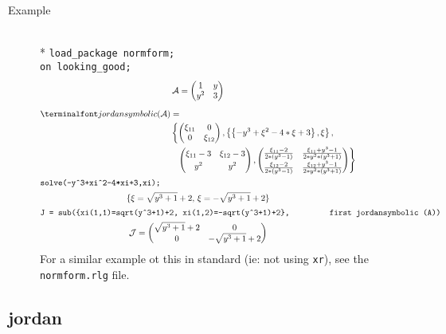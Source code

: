 \begin{description}
\item[Example]\mbox{}\\*
%
\texttt{load\_package normform;}\\
\texttt{on looking\_good;} 
\begin{gather*}
\mathcal{A} = \begin{pmatrix} 1 & y \\ y^2 & 3  \end{pmatrix}  \\[2mm]
\begin{split}
\f{jordansymbolic}(\mathcal{A}) &= \\ 
 & \left\{
     \begin{pmatrix} \xi_{11} & 0 \\ 0 & \xi_{12} \end{pmatrix} ,
     \left\{ \left\{ -y^3+\xi^2-4*\xi+3 \right\}, \xi \right\}, \right. \\
 & \hspace{0.1in} \left.
       \begin{pmatrix} \xi_{11} -3 & \xi_{12} -3 \\[1mm] y^2 & y^2 \end{pmatrix},
       \begin{pmatrix} \frac{\xi_{11} -2} {2*(y^3-1)}
                 & \frac{\xi_{11} + y^3 -1}{2*y^2*(y^3+1)} \\[1mm]
                \frac{\xi_{12} -2}{2*(y^3-1)}
                 & \frac{\xi_{12}+y^3-1}{2*y^2*(y^3+1)}
       \end{pmatrix}
  \right\} 
\end{split} \\
\intertext{\texttt{solve(-y\^{}3+xi\^{}2-4*xi+3,xi);}}
\{ \xi = \sqrt{y^3+1} + 2,\, \xi = -\sqrt{y^3+1}+2 \} \\
\intertext{\texttt{J = sub(\{xi(1,1)=sqrt(y\^{}3+1)+2, xi(1,2)=-sqrt(y\^{}3+1)+2\},
   \mbox{}\ \ \ \ \ \ \ \ first  jordansymbolic (A))}}
%
\mathcal{J} = \begin{pmatrix} \sqrt{y^3+1} + 2 & 0 \\ 0 & 
-\sqrt{y^3+1} + 2 \end{pmatrix}
\end{gather*}
For a similar example ot this in standard {\REDUCE} (ie: not using 
\texttt{xr}), see the \texttt{normform.rlg} file.
\end{description}

\subsection{jordan}

